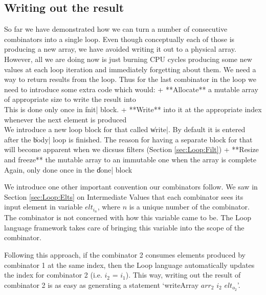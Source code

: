 \documentclass[preamble.tex]{subfiles}
\begin{document}
\subsection{Writing out the result}

So far we have demonstrated how we can turn a number of consecutive combinators into a single loop. Even though conceptually each of those is producing a new array, we have avoided writing it out to a physical array. However, all we are doing now is just burning CPU cycles producing some new values at each loop iteration and immediately forgetting about them. We need a way to return results from the loop. Thus for the last combinator in the loop we need to introduce some extra code which would:
+ **Allocate** a mutable array of appropriate size to write the result into\\
  This is done only once in \|init| block.
+ **Write** into it at the appropriate index whenever the next element is produced\\
  We introduce a new loop block for that called \|write|. By default it is entered after the \|body| loop is finished. The reason for having a separate block for that will become apparent when we dicsuss filters (Section \ref{sec:Loop:Filt})
+ **Resize and freeze** the mutable array to an immutable one when the array is complete\\
  Again, only done once in the \|done| block

We introduce one other important convention our combinators follow. We saw in Section \ref{sec:Loop:Elts} on Intermediate Values that each combinator sees its input element in variable $elt_{i_n}$, where $n$ is a unique number of the combinator. The combinator is not concerned with how this variable came to be. The Loop language framework takes care of bringing this variable into the scope of the combinator.

Following this approach, if the combinator 2 consumes elements produced by combinator 1 at the same index, then the Loop language automatically updates the index for combinator 2 (i.e. $i_2$ = $i_1$). This way, writing out the result of combinator 2 is as easy as generating a statement `writeArray $arr_2$ $i_2$ $elt_{o_2}$'.
\end{document}
